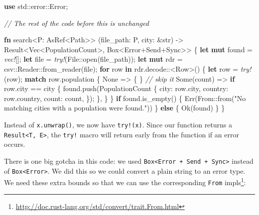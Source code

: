 \documentclass[a4paper,]{book}
\newenvironment{Shaded}{\begin{snugshade}}{\end{snugshade}}
\newcommand{\KeywordTok}[1]{\textcolor[rgb]{0.13,0.29,0.53}{\textbf{{#1}}}}
\newcommand{\DataTypeTok}[1]{\textcolor[rgb]{0.13,0.29,0.53}{{#1}}}
\newcommand{\ConstantTok}[1]{\textcolor[rgb]{0.00,0.00,0.00}{{#1}}}
\newcommand{\StringTok}[1]{\textcolor[rgb]{0.31,0.60,0.02}{{#1}}}
\newcommand{\CommentTok}[1]{\textcolor[rgb]{0.56,0.35,0.01}{\textit{{#1}}}}
\newcommand{\BuiltInTok}[1]{{#1}}
\newcommand{\PreprocessorTok}[1]{\textcolor[rgb]{0.56,0.35,0.01}{\textit{{#1}}}}
\newcommand{\NormalTok}[1]{{#1}}
\renewcommand{\href}[2]{#2\footnote{\url{#1}}}
\begin{document}
\begin{Shaded}
\begin{Highlighting}[]
\KeywordTok{use} \NormalTok{std::error::Error;}

\CommentTok{// The rest of the code before this is unchanged}

\KeywordTok{fn} \NormalTok{search<P: AsRef<Path>>}
         \NormalTok{(file_path: P, city: &}\DataTypeTok{str}\NormalTok{)}
         \NormalTok{-> }\DataTypeTok{Result}\NormalTok{<}\DataTypeTok{Vec}\NormalTok{<PopulationCount>, }\DataTypeTok{Box}\NormalTok{<Error+}\BuiltInTok{Send}\NormalTok{+}\BuiltInTok{Sync}\NormalTok{>> \{}
    \KeywordTok{let} \KeywordTok{mut} \NormalTok{found = }\PreprocessorTok{vec!}\NormalTok{[];}
    \KeywordTok{let} \NormalTok{file = }\PreprocessorTok{try!}\NormalTok{(File::open(file_path));}
    \KeywordTok{let} \KeywordTok{mut} \NormalTok{rdr = csv::Reader::from_reader(file);}
    \KeywordTok{for} \NormalTok{row }\KeywordTok{in} \NormalTok{rdr.decode::<Row>() \{}
        \KeywordTok{let} \NormalTok{row = }\PreprocessorTok{try!}\NormalTok{(row);}
        \KeywordTok{match} \NormalTok{row.population \{}
            \ConstantTok{None} \NormalTok{=> \{ \} }\CommentTok{// skip it}
            \ConstantTok{Some}\NormalTok{(count) => }\KeywordTok{if} \NormalTok{row.city == city \{}
                \NormalTok{found.push(PopulationCount \{}
                    \NormalTok{city: row.city,}
                    \NormalTok{country: row.country,}
                    \NormalTok{count: count,}
                \NormalTok{\});}
            \NormalTok{\},}
        \NormalTok{\}}
    \NormalTok{\}}
    \KeywordTok{if} \NormalTok{found.is_empty() \{}
        \ConstantTok{Err}\NormalTok{(From::from(}\StringTok{"No matching cities with a population were found."}\NormalTok{))}
    \NormalTok{\} }\KeywordTok{else} \NormalTok{\{}
        \ConstantTok{Ok}\NormalTok{(found)}
    \NormalTok{\}}
\NormalTok{\}}
\end{Highlighting}
\end{Shaded}

Instead of \texttt{x.unwrap()}, we now have \texttt{try!(x)}. Since our
function returns a \texttt{Result\textless{}T,\ E\textgreater{}}, the
\texttt{try!} macro will return early from the function if an error
occurs.

There is one big gotcha in this code: we used
\texttt{Box\textless{}Error\ +\ Send\ +\ Sync\textgreater{}} instead of
\texttt{Box\textless{}Error\textgreater{}}. We did this so we could
convert a plain string to an error type. We need these extra bounds so
that we can use the
\href{http://doc.rust-lang.org/std/convert/trait.From.html}{corresponding
\texttt{From} impls}:
\end{document}
